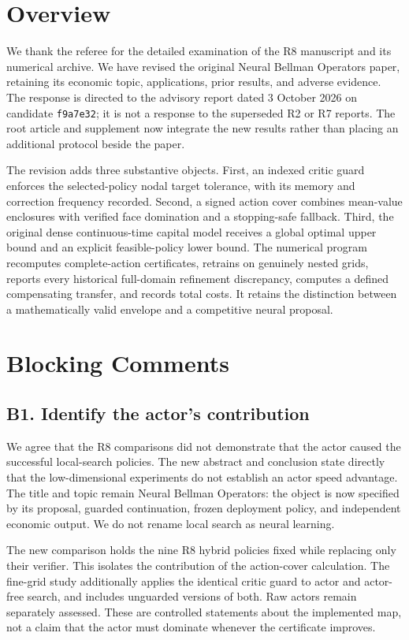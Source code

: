 \section{Overview}
We thank the referee for the detailed examination of the R8 manuscript and its numerical archive. We have revised the original Neural Bellman Operators paper, retaining its economic topic, applications, prior results, and adverse evidence. The response is directed to the advisory report dated 3 October 2026 on candidate \texttt{f9a7e32}; it is not a response to the superseded R2 or R7 reports. The root article and supplement now integrate the new results rather than placing an additional protocol beside the paper.

The revision adds three substantive objects. First, an indexed critic guard enforces the selected-policy nodal target tolerance, with its memory and correction frequency recorded. Second, a signed action cover combines mean-value enclosures with verified face domination and a stopping-safe fallback. Third, the original dense continuous-time capital model receives a global optimal upper bound and an explicit feasible-policy lower bound. The numerical program recomputes complete-action certificates, retrains on genuinely nested grids, reports every historical full-domain refinement discrepancy, computes a defined compensating transfer, and records total costs. It retains the distinction between a mathematically valid envelope and a competitive neural proposal.

\section{Blocking Comments}
\subsection*{B1. Identify the actor's contribution}
We agree that the R8 comparisons did not demonstrate that the actor caused the successful local-search policies. The new abstract and conclusion state directly that the low-dimensional experiments do not establish an actor speed advantage. The title and topic remain Neural Bellman Operators: the object is now specified by its proposal, guarded continuation, frozen deployment policy, and independent economic output. We do not rename local search as neural learning.

The new comparison holds the nine R8 hybrid policies fixed while replacing only their verifier. This isolates the contribution of the action-cover calculation. The fine-grid study additionally applies the identical critic guard to actor and actor-free search, and includes unguarded versions of both. Raw actors remain separately assessed. These are controlled statements about the implemented map, not a claim that the actor must dominate whenever the certificate improves.

